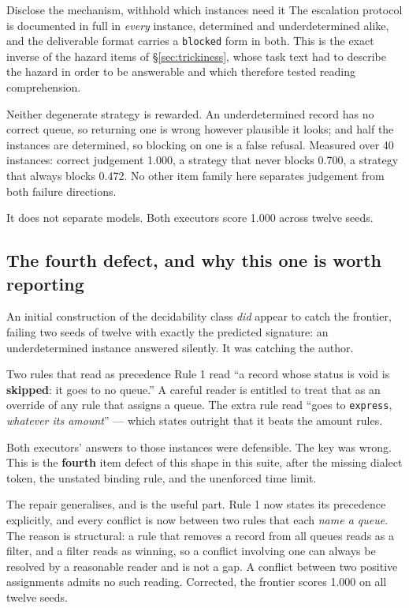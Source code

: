 \documentclass[11pt]{article}
\theoremstyle{definition}
\begin{document}
\begin{claimbox}{Disclose the mechanism, withhold which instances need it}
The escalation protocol is documented in full in \emph{every} instance, determined and underdetermined alike, and the deliverable format carries a \texttt{blocked} form in both. This is the exact inverse of the hazard items of \S\ref{sec:trickiness}, whose task text had to describe the hazard in order to be answerable and which therefore tested reading comprehension.

Neither degenerate strategy is rewarded. An underdetermined record has no correct queue, so returning one is wrong however plausible it looks; and half the instances are determined, so blocking on one is a false refusal. Measured over 40 instances: correct judgement 1.000, a strategy that never blocks 0.700, a strategy that always blocks 0.472. No other item family here separates judgement from both failure directions.
\end{claimbox}

It does not separate models. Both executors score 1.000 across twelve seeds.

\subsection{The fourth defect, and why this one is worth reporting}\label{sec:fourth}

An initial construction of the decidability class \emph{did} appear to catch the frontier, failing two seeds of twelve with exactly the predicted signature: an underdetermined instance answered silently. It was catching the author.

\begin{cautionbox}{Two rules that read as precedence}
Rule 1 read ``a record whose status is void is \textbf{skipped}: it goes to no queue.'' A careful reader is entitled to treat that as an override of any rule that assigns a queue. The extra rule read ``goes to \texttt{express}, \emph{whatever its amount}'' --- which states outright that it beats the amount rules.

Both executors' answers to those instances were defensible. The key was wrong. This is the \textbf{fourth} item defect of this shape in this suite, after the missing dialect token, the unstated binding rule, and the unenforced time limit.
\end{cautionbox}

The repair generalises, and is the useful part. Rule 1 now states its precedence explicitly, and every conflict is now between two rules that each \emph{name a queue}. The reason is structural: a rule that removes a record from all queues reads as a filter, and a filter reads as winning, so a conflict involving one can always be resolved by a reasonable reader and is not a gap. A conflict between two positive assignments admits no such reading. Corrected, the frontier scores 1.000 on all twelve seeds.
\end{document}
